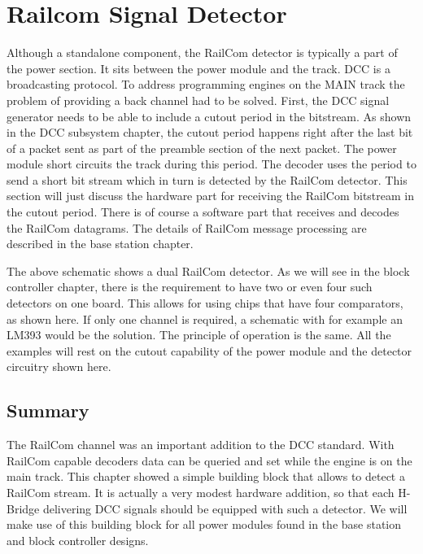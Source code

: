 \chapter{Railcom Signal Detector}

Although a standalone component, the RailCom detector is typically a part of the power section. It sits between the power module and the track. DCC is a broadcasting protocol. To address programming engines on the MAIN track the problem of providing a back channel had to be solved. First, the DCC signal generator needs to be able to include a cutout period in the bitstream. As shown in the DCC subsystem chapter, the cutout period happens right after the last bit of a packet sent as part of the preamble section of the next packet. The power module short circuits the track during this period. The decoder uses the period to send a short bit stream which in turn is detected by the RailCom detector. This section will just discuss the hardware part for receiving the RailCom bitstream in the cutout period. There is of course a software part that receives and decodes the RailCom datagrams. The details of RailCom message processing are described in the base station chapter.


The above schematic shows a dual RailCom detector. As we will see in the block controller chapter, there is the requirement to have two or even four such detectors on one board. This allows for using chips that have four comparators, as shown here. If only one channel is required, a schematic with for example an LM393 would be the solution. The principle of operation is the same. All the examples will rest on the cutout capability of the power module and the detector circuitry shown here.

\section{Summary}

The RailCom channel was an important addition to the DCC standard. With RailCom capable decoders data can be queried and set while the engine is on the main track. This chapter showed a simple building block that allows to detect a RailCom stream. It is actually a very modest hardware addition, so that each H-Bridge delivering DCC signals should be equipped with such a detector. We will make use of this building block for all power modules found in the base station and block controller designs.
